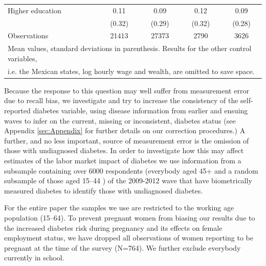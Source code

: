 \documentclass[12pt,english]{article}
\begin{document}
\begin{table}
\begin{adjustbox}{max width=0.9\textwidth, center}
{\begin{tabular}{l*{4}{c}}
Higher education    &        0.11&        0.09&        0.12&        0.09\\
                    &      (0.32)&      (0.29)&      (0.32)&      (0.28)\\
\midrule
Observations        &       21413&       27373&        2790&        3626\\
\bottomrule
\multicolumn{5}{l}{\footnotesize Mean values, standard deviations in parenthesis. Results for the other control variables,}\\
\multicolumn{5}{l}{\footnotesize i.e. the Mexican states, log hourly wage and wealth, are omitted to save space.}
\end{tabular}
}
\end{adjustbox}
\end{table}


Because the response to this question may well suffer from measurement error due to recall bias, we investigate and try to increase the consistency of the self-reported diabetes variable, using disease information from earlier and ensuing waves to infer on the current, missing or inconsistent, diabetes status (see Appendix \ref{sec:Appendix} for further details on our correction procedures.) A further, and no less important, source of measurement error is the omission of those with undiagnosed diabetes. In order to investigate how this may affect estimates of the labor market impact of diabetes we use information from a subsample containing over 6000 respondents (everybody aged 45+  and a random subsample of those aged 15--44 \parencite{Crimmins2015}) of the 2009-2012 wave that have biometrically measured diabetes to identify those with undiagnosed diabetes. 

For the entire paper the samples we use are restricted to the working age population (15--64). To prevent pregnant women from biasing our results due to the increased diabetes risk during pregnancy and its effects on female employment status, we have dropped all observations of women reporting to be pregnant at the time of the survey (N=764). We further exclude everybody currently in school.
\end{document}
